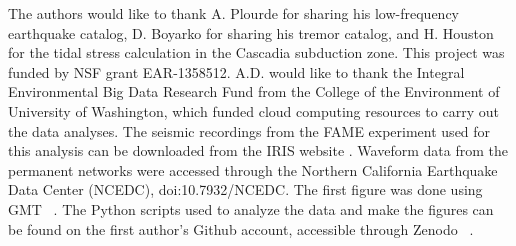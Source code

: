 \documentclass[draft]{agujournal2019}
\begin{document}
%
%
%
%
%
%
%
%


\acknowledgments
The authors would like to thank A. Plourde for sharing his low-frequency earthquake catalog, D. Boyarko for sharing his tremor catalog, and H. Houston for the tidal stress calculation in the Cascadia subduction zone. This project was funded by NSF grant EAR-1358512. A.D. would like to thank the Integral Environmental Big Data Research Fund from the College of the Environment of University of Washington, which funded cloud computing resources to carry out the data analyses. The seismic recordings from the FAME experiment used for this analysis can be downloaded from the IRIS website \cite{https://doi.org/10.7914/sn/xq_2007}. Waveform data from the permanent networks were accessed through the Northern California Earthquake Data Center (NCEDC), doi:10.7932/NCEDC. The first figure was done using GMT ~\cite{WES_1991}. The Python scripts used to analyze the data and make the figures can be found on the first author's Github account, accessible through Zenodo ~\cite{ariane_ducellier_2021_5168867}.



%
%





%
%
%
%
%
\end{document}
